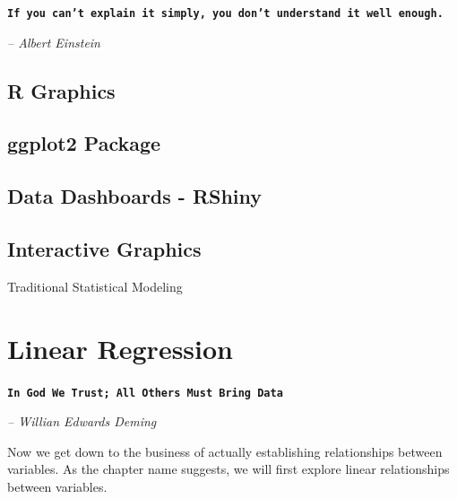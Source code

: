\documentclass[10pt, letterpaper, twoside]{memoir}\usepackage{knitr}
\makeatletter
\newcommand{\chapterendsymbol}{
    \vspace{24pt}
    \Huge
    \hrulefill \hspace{0.1in} \hspace{0.1in} \hrulefill
    \normalsize
    }
\renewcommand\part{%
  \if@openright
    \cleardoublepage
  \else
    \clearpage
  \fi
  \thispagestyle{empty}
  \null\vfil
  \secdef\@part\@spart
  }
\makeatother
\begin{document}
\begin{flushright}

\textbf{\texttt{If you can't explain it simply, you don't understand it well enough.}}

\emph{-- Albert Einstein}

\end{flushright}

\vspace{12pt}


\section{R Graphics}

\section{ggplot2 Package}

\section{Data Dashboards - RShiny}

\section{Interactive Graphics}


\chapterendsymbol



\part{Traditional Statistical Modeling}




\chapter{Linear Regression}

\begin{flushright}

\textbf{\texttt{In God We Trust; All Others Must Bring Data}}

\emph{-- Willian Edwards Deming}

\end{flushright}

\vspace{12pt}


Now we get down to the business of actually establishing relationships between variables. As the chapter name suggests, we will first explore linear relationships between variables. 
\end{document}
